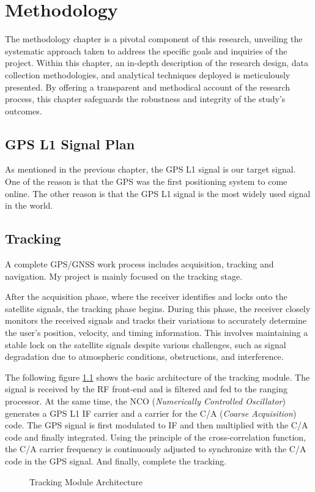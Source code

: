 \chapter{Methodology}
The methodology chapter is a pivotal component of this research, unveiling the systematic approach taken to address the specific goals and inquiries of the project. Within this chapter, an in-depth description of the research design, data collection methodologies, and analytical techniques deployed is meticulously presented. By offering a transparent and methodical account of the research process, this chapter safeguards the robustness and integrity of the study's outcomes.

\section{GPS L1 Signal Plan}
As mentioned in the previous chapter, the GPS L1 signal is our target signal. One of the reason is that the GPS was the first positioning  system to come online\cite{RN184}. The other reason is that the GPS L1 signal is the most widely used signal in the world. 

\section{Tracking}
A complete GPS/GNSS work process includes acquisition, tracking and navigation. My project is mainly focused on the tracking stage.

After the acquisition phase, where the receiver identifies and locks onto the satellite signals, the tracking phase begins. During this phase, the receiver closely monitors the received signals and tracks their variations to accurately determine the user's position, velocity, and timing information. This involves maintaining a stable lock on the satellite signals despite various challenges, such as signal degradation due to atmospheric conditions, obstructions, and interference.

The following figure \ref{fig:tracking_digram} shows the basic architecture of the tracking module. The signal is received by the RF front-end and is filtered and fed to the ranging processor. At the same time, the NCO (\textit{Numerically Controlled Oscillator}) generates a GPS L1 IF carrier and a carrier for the C/A (\textit{Coarse Acquisition}) code. The GPS signal is first modulated to IF and then multiplied with the C/A code and finally integrated. Using the principle of the cross-correlation function, the C/A carrier frequency is continuously adjusted to synchronize with the C/A code in the GPS signal. And finally, complete the tracking\cite{RN151}.
\begin{figure}[!h]
    \centering
    
    \caption{Tracking Module Architecture}
    \label{fig:tracking_digram}
\end{figure}

